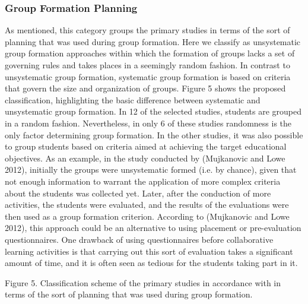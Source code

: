 \subsubsection{Group Formation Planning}

As mentioned, this category groups the primary studies in terms of the sort of planning that was used during group formation. Here we classify as unsystematic group formation approaches within which the formation of groups lacks a set of governing rules and takes places in a seemingly random fashion. In contrast to unsystematic group formation, systematic group formation is based on criteria that govern the size and organization of groups. Figure 5 shows the proposed classification, highlighting the basic difference between systematic and unsystematic group formation. In 12 of the selected studies, students are grouped in a random fashion. Nevertheless, in only 6 of these studies randomness is the only factor determining group formation. In the other studies, it was also possible to group students based on criteria aimed at achieving the target educational objectives. As an example, in the study conducted by (Mujkanovic and Lowe 2012), initially the groups were unsystematic formed (i.e. by chance), given that not enough information to warrant the application of more complex criteria about the students was collected yet. Later, after the conduction of more activities, the students were evaluated, and the results of the evaluations were then used as a group formation criterion. According to (Mujkanovic and Lowe 2012), this approach could be an alternative to using placement or pre-evaluation questionnaires. One drawback of using questionnaires before collaborative learning activities is that carrying out this sort of evaluation takes a significant amount of time, and it is often seen as tedious for the students taking part in it. 

Figure 5. Classification scheme of the primary studies in accordance with in terms of the sort of planning that was used during group formation.

